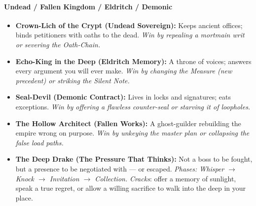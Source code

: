 \paragraph{Undead / Fallen Kingdom / Eldritch / Demonic}
\begin{itemize}
  \item \textbf{Crown-Lich of the Crypt (Undead Sovereign):} Keeps ancient offices; binds petitioners with oaths to the dead. \emph{Win by repealing a mortmain writ or severing the Oath-Chain.}
  \item \textbf{Echo-King in the Deep (Eldritch Memory):} A throne of voices; answers every argument you will ever make. \emph{Win by changing the Measure (new precedent) or striking the Silent Note.}
  \item \textbf{Seal-Devil (Demonic Contract):} Lives in locks and signatures; eats exceptions. \emph{Win by offering a flawless counter-seal or starving it of loopholes.}
  \item \textbf{The Hollow Architect (Fallen Works):} A ghost-guilder rebuilding the empire wrong on purpose. \emph{Win by unkeying the master plan or collapsing the false load paths.}
  \item \textbf{The Deep Drake (The Pressure That Thinks):} Not a boss to be fought, but a presence to be negotiated with --- or escaped. \emph{Phases: Whisper $\rightarrow$ Knock $\rightarrow$ Invitation $\rightarrow$ Collection.} \emph{Cracks}: offer a memory of sunlight, speak a true regret, or allow a willing sacrifice to walk into the deep in your place.
\end{itemize}


